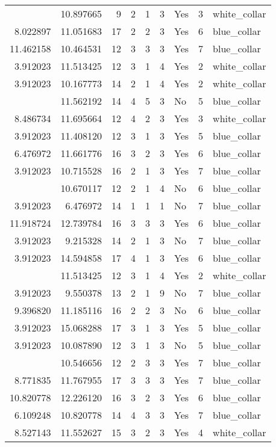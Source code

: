 \documentclass[
]{article}
\begin{document}
\begin{longtable}[t]{rrrrrllrl}
\addlinespace
3.912023 & 10.897665 & 9 & 2 & 1 & 3 & Yes & 3 & white\_collar\\
8.022897 & 11.051683 & 17 & 2 & 2 & 3 & Yes & 6 & blue\_collar\\
11.462158 & 10.464531 & 12 & 3 & 3 & 3 & Yes & 7 & blue\_collar\\
3.912023 & 11.513425 & 12 & 3 & 1 & 4 & Yes & 2 & white\_collar\\
3.912023 & 10.167773 & 14 & 2 & 1 & 4 & Yes & 2 & white\_collar\\
\addlinespace
8.306472 & 11.562192 & 14 & 4 & 5 & 3 & No & 5 & blue\_collar\\
8.486734 & 11.695664 & 12 & 4 & 2 & 3 & Yes & 3 & white\_collar\\
3.912023 & 11.408120 & 12 & 3 & 1 & 3 & Yes & 5 & blue\_collar\\
6.476972 & 11.661776 & 16 & 3 & 2 & 3 & Yes & 6 & blue\_collar\\
3.912023 & 10.715528 & 16 & 2 & 1 & 3 & Yes & 7 & blue\_collar\\
\addlinespace
3.912023 & 10.670117 & 12 & 2 & 1 & 4 & No & 6 & blue\_collar\\
3.912023 & 6.476972 & 14 & 1 & 1 & 1 & No & 7 & blue\_collar\\
11.918724 & 12.739784 & 16 & 3 & 3 & 3 & Yes & 6 & blue\_collar\\
3.912023 & 9.215328 & 14 & 2 & 1 & 3 & No & 7 & blue\_collar\\
3.912023 & 14.594858 & 17 & 4 & 1 & 3 & Yes & 6 & blue\_collar\\
\addlinespace
3.912023 & 11.513425 & 12 & 3 & 1 & 4 & Yes & 2 & white\_collar\\
3.912023 & 9.550378 & 13 & 2 & 1 & 9 & No & 7 & blue\_collar\\
9.396820 & 11.185116 & 16 & 2 & 2 & 3 & No & 6 & blue\_collar\\
3.912023 & 15.068288 & 17 & 3 & 1 & 3 & Yes & 5 & blue\_collar\\
3.912023 & 10.087890 & 12 & 3 & 1 & 3 & No & 5 & blue\_collar\\
\addlinespace
6.856462 & 10.546656 & 12 & 2 & 3 & 3 & Yes & 7 & blue\_collar\\
8.771835 & 11.767955 & 17 & 3 & 3 & 3 & Yes & 7 & blue\_collar\\
10.820778 & 12.226120 & 16 & 3 & 2 & 3 & Yes & 6 & blue\_collar\\
6.109248 & 10.820778 & 14 & 4 & 3 & 3 & Yes & 7 & blue\_collar\\
8.527143 & 11.552627 & 15 & 3 & 2 & 3 & Yes & 4 & white\_collar\\

\end{longtable}
\end{document}
